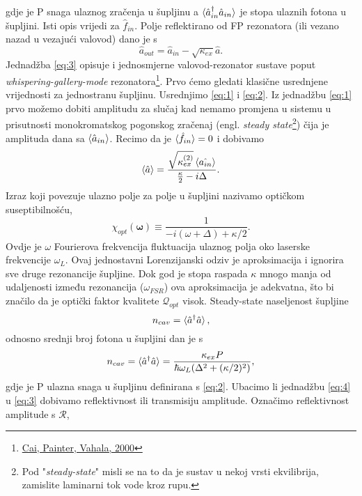 gdje je P snaga ulaznog zračenja u šupljinu a $\braket{\hat{a}_{in}^{\dagger}\hat{a}_{in}}$ je stopa ulaznih fotona u šupljini. Isti opis vrijedi za $\hat{f}_{in}$.
Polje reflektirano od FP rezonatora (ili vezano nazad u vezajući valovod) dano je s 
\begin{equation}
	\hat{a}_{out} = \hat{a}_{in} - \sqrt{\kappa_{ex}}\hat{a}.
	\label{eq:3}
\end{equation}
Jednadžba \ref{eq:3} opisuje i jednosmjerne valovod-rezonator sustave poput \textit{whispering-gallery-mode} rezonatora\footnote{\href{https://journals.aps.org/prl/abstract/10.1103/PhysRevLett.85.74}{Cai, Painter, Vahala, 2000}}.
Prvo ćemo gledati klasične usrednjene vrijednosti za jednostranu šupljinu. Usrednjimo \ref{eq:1} i \ref{eq:2}. Iz jednadžbu \ref{eq:1} prvo možemo dobiti amplitudu za slučaj kad 
nemamo promjena u sistemu u prisutnosti monokromatskog pogonskog zračenaj (engl. \textit{steady state}\footnote{ Pod "\textit{steady-state}" misli se na to da je sustav u nekoj vrsti ekvilibrija, zamislite laminarni tok vode kroz rupu. })
čija je amplituda dana sa $\braket{\hat{a}_{in}}$. Recimo da je $\braket{\hat{f}_{in}} = 0$ i dobivamo
\begin{equation}
	\braket{\hat{a}} = \frac{\sqrt{\kappa_{ex}^{(2)}}\braket{\hat{a_{in}}}}{\frac{\kappa}{2} - i\Delta}.
	\label{eq:4}
\end{equation}
Izraz koji povezuje ulazno polje za polje u šupljini nazivamo optičkom suseptibilnošću,
\begin{equation}
	\chi_{opt}(\mathbf{\omega}) \equiv \frac{1}{-i(\omega+\Delta)+\kappa/2}.
	\label{eq:5}
\end{equation}
Ovdje je $\omega$ Fourierova frekvencija fluktuacija ulaznog polja oko laserske frekvencije $\omega_L$. Ovaj jednostavni Lorenzijanski odziv je aproksimacija i ignorira sve druge rezonancije šupljine. 
Dok god je stopa raspada $\kappa$ mnogo manja od udaljenosti između rezonancija ($\omega_{FSR}$) ova aproksimacija je adekvatna, što bi značilo da je optički faktor kvalitete $\mathcal{Q}_{opt}$ visok. 
Steady-state naseljenost šupljine 
\begin{equation}
	n_{cav} = \braket{\hat{a}^{\dagger}\hat{a}},
	\label{eq:6}
\end{equation}
odnosno srednji broj fotona u šupljini dan je s 
\begin{equation}
	n_{cav} = \braket{\hat{a}^{\dagger}\hat{a}} = \frac{\kappa_{ex}P}{\hbar\omega_L(\Delta^2+(\kappa/2)^2)},
	\label{eq:7}
\end{equation}
gdje je P ulazna snaga u šupljinu definirana s \ref{eq:2}. Ubacimo li jednadžbu \ref{eq:4} u \ref{eq:3} dobivamo reflektivnost ili transmisiju amplitude. Označimo reflektivnost amplitude s $\mathcal{R}$,
